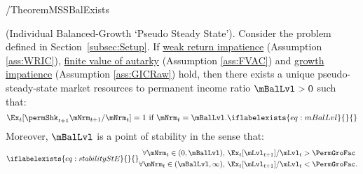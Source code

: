 \documentclass[BufferStockTheory]{subfiles}
\begin{document}
\begin{verbatimwrite}{\EqDir/TheoremMSSBalExists}
  \begin{theorem}(Individual Balanced-Growth `Pseudo Steady State').
    Consider the problem defined in Section~\ref{subsec:Setup}. If \hyperlink{WRIC}{weak return impatience} (Assumption \ref{ass:WRIC}), \hyperlink{FVAC}{finite value of autarky} (Assumption \ref{ass:FVAC}) and \hyperlink{GICRaw}{growth impatience} (Assumption \ref{ass:GICRaw}) hold, then there exists a unique pseudo-steady-state market resources to permanent income ratio $\mBalLvl>0$ such that:
    \begin{equation}
      \Ex_t [\permShk_{t+1}{\mNrm}_{t+1}/\mNrm_t] = 1 \mbox{~if~} \mNrm_t = \mBalLvl.
      \iflabelexists{eq:mBalLvl}{}{\label{eq:mBalLvl}} %
    \end{equation}
    Moreover, $\mBalLvl$ is a point of stability in the sense that:
    \begin{equation}
      \iflabelexists{eq:stabilityStE}{}{\label{eq:stabilityStE}} %
      \begin{split}
        \forall {\mNrm}_t\in(0,\mBalLvl),      \,\,& \Ex_{t}[\mLvl_{t+1}]/\mLvl_{t} > \PermGroFac \\
        \forall {\mNrm}_t\in(\mBalLvl,\infty), \,\,& \Ex_{t}[\mLvl_{t+1}]/\mLvl_{t} < \PermGroFac.
      \end{split}
    \end{equation}
  \end{theorem}
\end{verbatimwrite}

\end{document}
